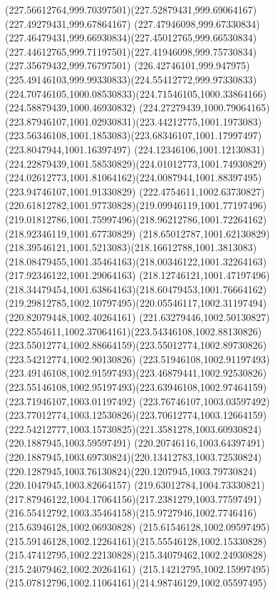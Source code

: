 {{		\curveto(227.56612764,999.70397501)(227.52879431,999.69064167)(227.49279431,999.67864167)
		\curveto(227.47946098,999.67330834)(227.46479431,999.66930834)(227.45012765,999.66530834)
		\curveto(227.44612765,999.71197501)(227.41946098,999.75730834)(227.35679432,999.76797501)
		\curveto(226.42746101,999.947975)(225.49146103,999.99330833)(224.55412772,999.97330833)
		\curveto(224.70746105,1000.08530833)(224.71546105,1000.33864166)(224.58879439,1000.46930832)
		\curveto(224.27279439,1000.79064165)(223.87946107,1001.02930831)(223.44212775,1001.1973083)
		\curveto(223.56346108,1001.1853083)(223.68346107,1001.17997497)(223.8047944,1001.16397497)
		\curveto(224.12346106,1001.12130831)(224.22879439,1001.58530829)(224.01012773,1001.74930829)
		\curveto(224.02612773,1001.81064162)(224.0087944,1001.88397495)(223.94746107,1001.91330829)
		\curveto(222.4754611,1002.63730827)(220.61812782,1001.97730828)(219.09946119,1001.77197496)
		\curveto(219.01812786,1001.75997496)(218.96212786,1001.72264162)(218.92346119,1001.67730829)
		\curveto(218.65012787,1001.62130829)(218.39546121,1001.5213083)(218.16612788,1001.3813083)
		\curveto(218.08479455,1001.35464163)(218.00346122,1001.32264163)(217.92346122,1001.29064163)
		\curveto(218.12746121,1001.47197496)(218.34479454,1001.63864163)(218.60479453,1001.76664162)
		\curveto(219.29812785,1002.10797495)(220.05546117,1002.31197494)(220.82079448,1002.40264161)
		\curveto(221.63279446,1002.50130827)(222.8554611,1002.37064161)(223.54346108,1002.88130826)
		\curveto(223.55012774,1002.88664159)(223.55012774,1002.89730826)(223.54212774,1002.90130826)
		\curveto(223.51946108,1002.91197493)(223.49146108,1002.91597493)(223.46879441,1002.92530826)
		\curveto(223.55146108,1002.95197493)(223.63946108,1002.97464159)(223.71946107,1003.01197492)
		\curveto(223.76746107,1003.03597492)(223.77012774,1003.12530826)(223.70612774,1003.12664159)
		\curveto(222.54212777,1003.15730825)(221.3581278,1003.60930824)(220.1887945,1003.59597491)
		\curveto(220.20746116,1003.64397491)(220.1887945,1003.69730824)(220.13412783,1003.72530824)
		\curveto(220.1287945,1003.76130824)(220.1207945,1003.79730824)(220.1047945,1003.82664157)
		\curveto(219.63012784,1004.73330821)(217.87946122,1004.17064156)(217.2381279,1003.77597491)
		\curveto(216.55412792,1003.35464158)(215.9727946,1002.7746416)(215.63946128,1002.06930828)
		\curveto(215.61546128,1002.09597495)(215.59146128,1002.12264161)(215.55546128,1002.15330828)
		\curveto(215.47412795,1002.22130828)(215.34079462,1002.24930828)(215.24079462,1002.20264161)
		\curveto(215.14212795,1002.15997495)(215.07812796,1002.11064161)(214.98746129,1002.05597495)
}}
